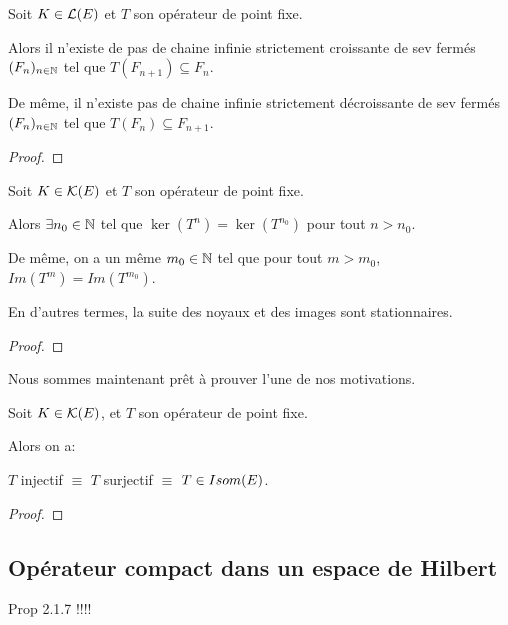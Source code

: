 \begin{proposition}
	Soit $K \in \mathcal{L}(E)$ et $T$ son opérateur de point fixe.
	
	Alors il n'existe de pas de chaine infinie strictement croissante de sev
	fermés $(F_{n})_{n \in \mathbb{N}}$ tel que $T(F_{n + 1}) \subseteq
	F_{n}$.

	De même, il n'existe pas de chaine infinie strictement décroissante de
	sev fermés $(F_{n})_{n \in \mathbb{N}}$ tel que $T(F_{n}) \subseteq F_{n +
	1}$.
\end{proposition}

\begin{proof}
\end{proof}

\begin{corollary}
	Soit $K \in \mathcal{K}(E)$ et $T$ son opérateur de point fixe.

	Alors $\exists n_{0} \in \mathbb{N}$ tel que $\ker(T^{n}) = \ker(T^{n_{0}})$
	pour tout $n > n_{0}$.

	De même, on a un même $m_{0} \in \mathbb{N}$ tel que pour tout $m > m_{0}$,
	$Im(T^{m}) = Im(T^{m_{0}})$.

	En d'autres termes, la suite des noyaux et des images sont stationnaires.
\end{corollary}

\begin{proof}
	
\end{proof}

Nous sommes maintenant prêt à prouver l'une de nos motivations.

\begin{proposition}
	\label{prop:equiv_inj_surj_bij}
	Soit $K \in \mathcal{K}(E)$, et $T$ son opérateur de point fixe.

	Alors on a:

	$T$ injectif $\equiv$ $T$ surjectif $\equiv$ $T \in Isom(E)$.
\end{proposition}

\begin{proof}
	
\end{proof}

\subsection{Opérateur compact dans un espace de Hilbert}

Prop 2.1.7 !!!!

